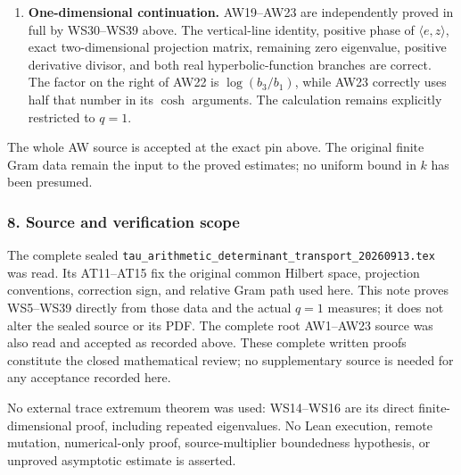 \begin{enumerate}
\item
  \textbf{One-dimensional continuation.} AW19--AW23 are independently proved in full by WS30--WS39 above. The vertical-line identity, positive phase of \(\langle e,z\rangle\), exact two-dimensional projection matrix, remaining zero eigenvalue, positive derivative divisor, and both real hyperbolic-function branches are correct. The factor on the right of AW22 is \(\log(b_3/b_1)\), while AW23 correctly uses half that number in its \(\cosh\) arguments. The calculation remains explicitly restricted to \(q=1\).
\end{enumerate}

The whole AW source is accepted at the exact pin above. The original finite Gram data remain the input to the proved estimates; no uniform bound in \(k\) has been presumed.

\subsubsection{8. Source and verification scope}\label{endpoint-window_review--source-and-verification-scope}

The complete sealed \nolinkurl{tau_arithmetic_determinant_transport_20260913.tex} was read. Its AT11--AT15 fix the original common Hilbert space, projection conventions, correction sign, and relative Gram path used here. This note proves WS5--WS39 directly from those data and the actual \(q=1\) measures; it does not alter the sealed source or its PDF. The complete root AW1--AW23 source was also read and accepted as recorded above. These complete written proofs constitute the closed mathematical review; no supplementary source is needed for any acceptance recorded here.

No external trace extremum theorem was used: WS14--WS16 are its direct finite-dimensional proof, including repeated eigenvalues. No Lean execution, remote mutation, numerical-only proof, source-multiplier boundedness hypothesis, or unproved asymptotic estimate is asserted.

\endgroup


\endgroup
